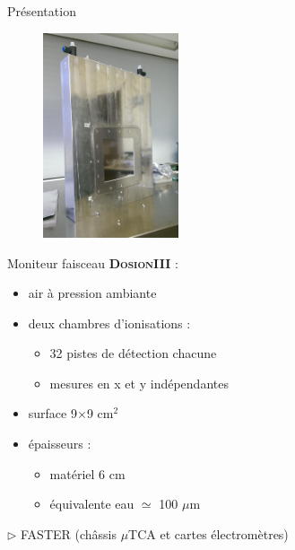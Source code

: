 \documentclass[10pt]{beamer}
\title{\dosion}
\subtitle{Monitorage faisceaux de moyenne et haute intensité}
\date{26 juin 2017}
\author{J.M. Fontbonne, E. Garrido et S. Salvador}
\institute{Jussieu}
\newcommand{\dosion}{\textbf{\textsc{Dosion}}\xspace}
\begin{document}
\maketitle

{

\begin{frame}[fragile]{Présentation}
\begin{minipage}[h]{.4\linewidth}
\begin{figure}[h]
\begin{center}
\includegraphics[width=4cm]{Dosion_vert.jpg} 
\end{center}
\end{figure}
\end{minipage}
\hfill
\begin{minipage}[h]{.56\linewidth}
Moniteur faisceau \dosion \textbf{III}\cite{boissonnat:2017} :
\begin{itemize}
\item air à pression ambiante
\item deux chambres d'ionisations :
\begin{itemize}
\item 32 pistes de détection chacune
\item mesures en x et y indépendantes
\end{itemize}
\item surface 9$\times$9 cm$^2$
\item épaisseurs :
\begin{itemize}
\item matériel 6 cm
\item équivalente eau $\simeq$ 100 $\mu$m
\end{itemize}
\end{itemize}
\vspace{1ex}
$\rhd$ FASTER (châssis $\mu$TCA et cartes électromètres)
\end{minipage}
\end{frame}
}
\end{document}
